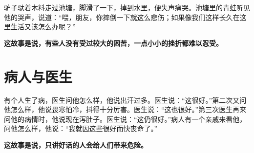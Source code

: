 驴子驮着木料走过池塘，脚滑了一下，掉到水里，便失声痛哭。池塘里的青蛙听见他的哭声，说道：“喂，朋友，你摔倒一下就这么悲伤；如果像我们这样长久在这里生活又该怎么办呢？”

{\bfseries \color{red}这故事是说，有些人没有受过较大的困苦，一点小小的挫折都难以忍受。}

\section{病人与医生}

有个人生了病，医生问他怎么样，他说出汗过多。医生说：“这很好。”第二次又问他怎么样，他说畏寒怕冷，抖得十分厉害。医生说：“这也很好。”第三次医生再来问他的病情时，他说现在泻肚子。医生说：“这仍很好。”病人有一个亲戚来看他，问他怎么样，他说：“我就因这些很好而快丧命了。”

{\bfseries \color{red}这故事是说，只讲好话的人会给人们带来危险。}

